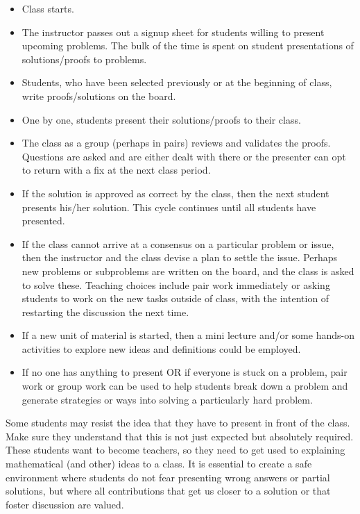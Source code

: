 \documentclass[12pt, reqno]{amsart}
\theoremstyle{remark}
\theoremstyle{definition}
\numberwithin{equation}{section}  %
\begin{document}
\begin{itemize}
\item
Class starts.
\item
The instructor passes out a signup sheet for students willing to present upcoming problems. The bulk of the time is spent on student presentations of solutions/proofs to problems.
\item
Students, who have been selected previously or at the beginning of class, write proofs/solutions on the board.
\item
One by one, students present their solutions/proofs to their class.
\item
The class as a group (perhaps in pairs) reviews and validates the proofs.  Questions are asked and are either dealt with there or the presenter can opt to return with a fix at the next class period.
\item
If the solution is approved as correct by the class, then the next student presents his/her solution.  This cycle continues until all students have presented.
\item
If the class cannot arrive at a consensus on a particular problem or issue, then the instructor and the class devise a plan to settle the issue.  Perhaps new problems or subproblems are written on the board, and the class is asked to solve these.  Teaching choices include pair work immediately or asking students to work on the new tasks outside of class, with the intention of restarting the discussion the next time.
\item
If a new unit of material is started, then a mini lecture and/or some hands-on activities to explore new ideas and definitions could be employed.
\item
If no one has anything to present OR if everyone is stuck on a problem, pair work or group work can be used to help students break down a problem and generate strategies or ways into solving a particularly hard problem.
\end{itemize}

Some students may resist the idea that they have to present in front of the class.  Make sure they understand that this is not just expected but absolutely required.  These students want to become teachers, so they need to get used to explaining mathematical (and other) ideas to a class.  It is essential to create a safe environment where students do not fear presenting wrong answers or partial solutions, but where all contributions that get us closer to a solution or that foster discussion are valued.
\end{document}
